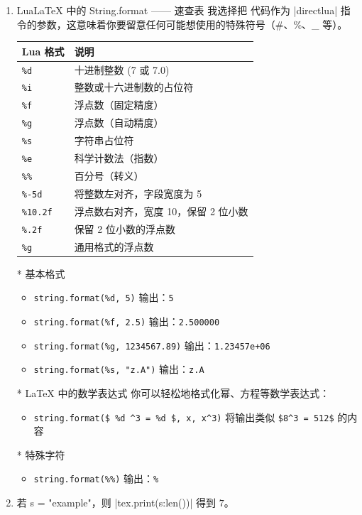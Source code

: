 \begin{enumerate}[label=(\alph*)]
\item LuaLaTeX 中的 String.format —— 速查表
我选择把  代码作为 |directlua| 指令的参数，这意味着你要留意任何可能想使用的特殊符号（\#、\%、\_ 等）。

\begin{center}
  \begin{tabular}{@{}ll@{}}
  \toprule
  \textbf{Lua 格式}   & \textbf{说明} \\ \midrule
  \texttt{\%d}      & 十进制整数   (7 或 7.0)                           \\
  \texttt{\%i}      & 整数或十六进制数的占位符         \\
  \texttt{\%f}      & 浮点数（固定精度）      \\
  \texttt{\%g}      & 浮点数（自动精度）  \\
  \texttt{\%s}      & 字符串占位符                            \\
  \texttt{\%e}      & 科学计数法（指数）               \\
  \texttt{\%\%}     & 百分号（转义）                      \\
  \texttt{\%-5d}    & 将整数左对齐，字段宽度为 5  \\
  \texttt{\%10.2f}  & 浮点数右对齐，宽度 10，保留 2 位小数 \\
  \texttt{\%.2f}    & 保留 2 位小数的浮点数  \\
  \texttt{\%g}      & 通用格式的浮点数    \\ \bottomrule
  \end{tabular}
\end{center}


* 基本格式
\begin{itemize}
  \item \texttt{string.format(\%d, 5)} 输出：\texttt{5}
  \item \texttt{string.format(\%f, 2.5)} 输出：\texttt{2.500000}
  \item \texttt{string.format(\%g, 1234567.89)} 输出：\texttt{1.23457e+06}
  \item \texttt{string.format(\%s, "z.A")} 输出：\texttt{z.A}
\end{itemize}

* LaTeX 中的数学表达式
你可以轻松地格式化幂、方程等数学表达式：
\begin{itemize}
  \item \texttt{string.format(\$ \%d \textasciicircum 3 = \%d \$, x, x\textasciicircum3)} 将输出类似 \texttt{\$8\textasciicircum 3 = 512\$} 的内容
\end{itemize}

* 特殊字符
\begin{itemize}
  \item \texttt{string.format(\%\%)} 输出：\texttt{\%}
\end{itemize}


\item 若 s = "example"，则 |tex.print(s:len())| 得到 $7$。
\end{enumerate}

